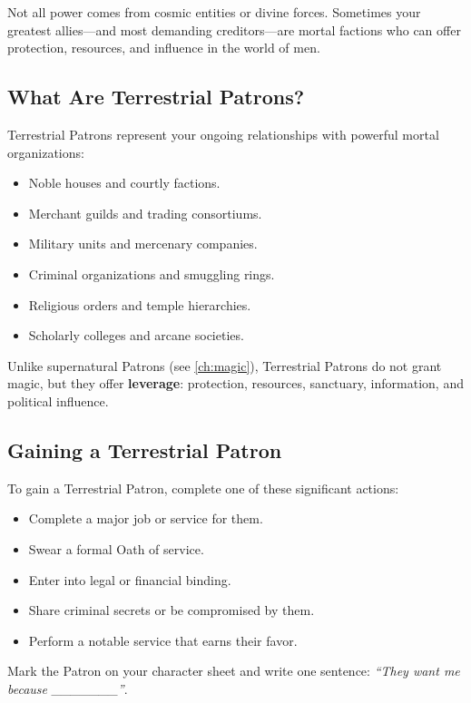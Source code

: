 Not all power comes from cosmic entities or divine forces. Sometimes your greatest allies---and most demanding creditors---are mortal factions who can offer protection, resources, and influence in the world of men.

\subsection{What Are Terrestrial Patrons?}
\label{sec:terrestrial-definition}

Terrestrial Patrons represent your ongoing relationships with powerful mortal organizations:
\begin{itemize}
    \item Noble houses and courtly factions.
    \item Merchant guilds and trading consortiums.
    \item Military units and mercenary companies.
    \item Criminal organizations and smuggling rings.
    \item Religious orders and temple hierarchies.
    \item Scholarly colleges and arcane societies.
\end{itemize}

Unlike supernatural Patrons (see \ref{ch:magic}), Terrestrial Patrons do not grant magic, but they offer \textbf{leverage}: protection, resources, sanctuary, information, and political influence.

\subsection{Gaining a Terrestrial Patron}
\label{sec:terrestrial-gaining}

To gain a Terrestrial Patron, complete one of these significant actions:
\begin{itemize}
    \item Complete a major job or service for them.
    \item Swear a formal Oath of service.
    \item Enter into legal or financial binding.
    \item Share criminal secrets or be compromised by them.
    \item Perform a notable service that earns their favor.
\end{itemize}
Mark the Patron on your character sheet and write one sentence: \emph{``They want me because \_\_\_\_\_\_\_''}.

